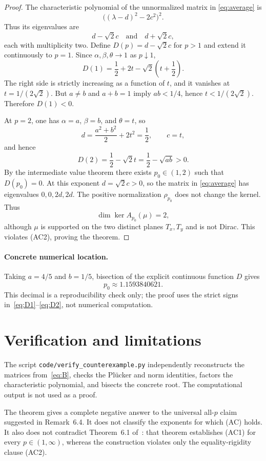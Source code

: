 \documentclass[11pt]{article}
\begin{document}
\begin{proof}
The characteristic polynomial of the unnormalized matrix in
\eqref{eq:average} is
\[
 \big((\lambda-d)^2-2c^2\big)^2.
\]
Thus its eigenvalues are
\[
 d-\sqrt2c\quad\text{and}\quad d+\sqrt2c,
\]
each with multiplicity two.  Define $D(p)=d-\sqrt2c$ for $p>1$ and extend it
continuously to $p=1$.  Since $\alpha,\beta,\theta\to1$ as $p\downarrow1$,
\begin{equation}\label{eq:D1}
 D(1)=\frac12+2t-\sqrt2\left(t+\frac12\right).
\end{equation}
The right side is strictly increasing as a function of $t$, and it vanishes
at $t=1/(2\sqrt2)$.  But $a\ne b$ and $a+b=1$ imply
$ab<1/4$, hence $t<1/(2\sqrt2)$.  Therefore $D(1)<0$.

At $p=2$, one has $\alpha=a$, $\beta=b$, and $\theta=t$, so
\[
 d=\frac{a^2+b^2}{2}+2t^2=\frac12,
 \qquad c=t,
\]
and hence
\begin{equation}\label{eq:D2}
 D(2)=\frac12-\sqrt2t=\frac12-\sqrt{ab}>0.
\end{equation}
By the intermediate value theorem there exists $p_0\in(1,2)$ such that
$D(p_0)=0$.  At this exponent $d=\sqrt2c>0$, so the matrix in
\eqref{eq:average} has eigenvalues $0,0,2d,2d$.  The positive normalization
$\rho_{p_0}$ does not change the kernel.  Thus
\[
 \dim\ker A_{p_0}(\mu)=2,
\]
although $\mu$ is supported on the two distinct planes $T_x,T_y$ and is not
Dirac.  This violates (AC2), proving the theorem.
\end{proof}

\paragraph{Concrete numerical location.}
Taking $a=4/5$ and $b=1/5$, bisection of the explicit continuous function
$D$ gives
\[
 p_0\approx1.1593840621.
\]
This decimal is a reproducibility check only; the proof uses the strict signs
in~\eqref{eq:D1}--\eqref{eq:D2}, not numerical computation.

\section{Verification and limitations}

The script \texttt{code/verify\_counterexample.py} independently reconstructs
the matrices from~\eqref{eq:B}, checks the Pl\"ucker and norm identities,
factors the characteristic polynomial, and bisects the concrete root.  The
computational output is not used as a proof.

The theorem gives a complete negative answer to the universal all-$p$ claim
suggested in Remark~6.4.  It does not classify the exponents for which (AC)
holds.  It also does not contradict Theorem~6.1 of~\cite{DRT}: that theorem
establishes (AC1) for every $p\in(1,\infty)$, whereas the construction violates
only the equality-rigidity clause (AC2).
\end{document}
